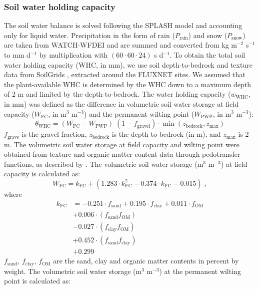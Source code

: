 \documentclass{myreport}
\begin{document}
\subsubsection{Soil water holding capacity}
\label{sec:whc}
The soil water balance is solved following the SPLASH model and accounting only for liquid water. Precipitation in the form of rain ($P_{\text{rain}}$) and snow ($P_{\text{snow}}$) are taken from WATCH-WFDEI \citep{Weedon2014-nv} and are summed and converted from kg m$^{-2}$ s$^{-1}$ to mm d$^{-1}$ by multiplication with $(60 \cdot 60 \cdot 24)$ s d$^{-1}$. To obtain the total soil water holding capacity (WHC, in mm), we use soil depth-to-bedrock and texture data from SoilGrids \citep{Hengl2014-jm}, extracted around the FLUXNET sites. We assumed that the plant-available WHC is determined by the WHC down to a maximum depth of 2 m and limited by the depth-to-bedrock. The water holding capacity ($w_\text{WHC}$, in mm) was defined as the difference in volumetric soil water storage at field capacity ($W_{\text{FC}}$, in m$^3$ m$^{-3}$) and the permanent wilting point ($W_{\text{PWP}}$, in m$^3$ m$^{-3}$):
\begin{equation}
\theta_\text{WHC} = (W_{\text{FC}} - W_{\text{PWP}}) \; (1-f_\text{gravel})\cdot \min(z_\text{bedrock}, z_\text{max})
\end{equation}
$f_\text{grave}$ is the gravel fraction, $z_\text{bedrock}$ is the depth to bedrock (in m), and $z_\text{max}$ is 2 m. The volumetric soil water storage at field capacity and wilting point were obtained from texture and organic matter content data through pedotransfer functions, as described by \citet{saxton06}. The volumetric soil water storage (m$^3$ m$^{-3}$) at field capacity is calculated as:
\begin{equation}
W_{\text{FC}}= k_\text{FC}+(1.283\cdot k_\text{FC}^{2}-0.374\cdot k_\text{FC}-0.015)\;, 
\end{equation}
where
\begin{align}
k_\text{FC} &=-0.251\cdot f_{\text{sand}} + 0.195\cdot f_{\text{clay}} + 0.011\cdot f_{\text{OM}}\\                            
&+ 0.006\cdot (f_{\text{sand}} f_{\text{OM}})\\
&- 0.027\cdot (f_{\text{clay}} f_{\text{OM}})\\
&+ 0.452\cdot (f_{\text{sand}} f_{\text{clay}})\\
&+ 0.299
\end{align}
$f_{\text{sand}}$, $f_{\text{clay}}$, $f_{\text{OM}}$ are the sand, clay and organic matter contents in percent by weight. The volumetric soil water storage (m$^3$ m$^{-3}$) at the permanent wilting point is calculated as:
\end{document}
